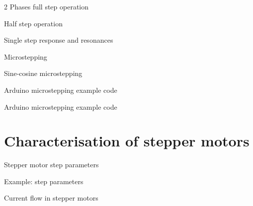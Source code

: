 \documentclass[compress]{beamer}
\begin{document}
{
    \begin{frame}{2 Phases full step operation}
    \end{frame}
}

{
    \begin{frame}{Half step operation}
    \end{frame}
}

{
    \begin{frame}{Single step response and resonances}
    \end{frame}
}

{
    \begin{frame}{Microstepping}
    \end{frame}
}

{
    \begin{frame}{Sine-cosine microstepping}
    \end{frame}
}

{
    \begin{frame}{Arduino microstepping example code}
    \end{frame}
}

{
    \begin{frame}{Arduino microstepping example code}
    \end{frame}
}

\section[Characterisation]{Characterisation of stepper motors}

{
    \begin{frame}{Stepper motor step parameters}
    \end{frame}
}

{
    \begin{frame}{Example: step parameters}
    \end{frame}
}
{
    \begin{frame}{Current flow in stepper motors}
    \end{frame}
}
\end{document}
